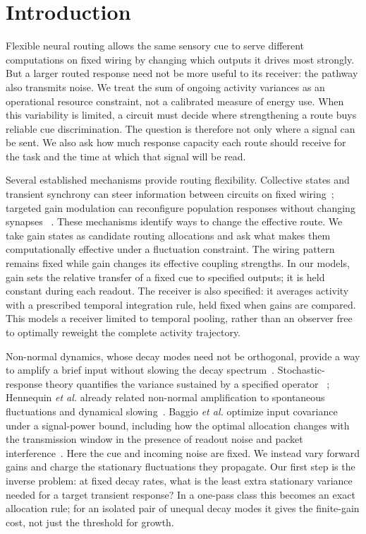 \documentclass[aps,10pt,onecolumn,superscriptaddress,nofootinbib,longbibliography,
  amsmath,amssymb,floatfix]{revtex4-2}
\begin{document}
\section{Introduction}

Flexible neural routing allows the same sensory cue to serve
different computations on fixed wiring by changing which outputs
it drives most strongly. But a larger routed response need not be
more useful to its receiver: the pathway also transmits noise.
We treat the sum of ongoing activity variances as an operational
resource constraint, not a calibrated measure of energy use.
When this variability is limited, a circuit must decide where
strengthening a route buys reliable cue discrimination. The question
is therefore not only where a signal can be sent. We also ask how
much response capacity each route should receive for the task and
the time at which that signal will be read.

Several established mechanisms provide routing flexibility.
Collective states and transient synchrony can steer information
between circuits on fixed wiring~\cite{battaglia2012routing,
palmigiano2017routing,kirst2016routing}; targeted gain modulation
can reconfigure population responses without changing synapses
~\cite{stroud2018,barbosa2023}. These mechanisms identify ways to
change the effective route. We take gain states as candidate routing
allocations and ask what makes them computationally effective under
a fluctuation constraint. The wiring pattern remains fixed while
gain changes its effective coupling strengths. In our models, gain sets the relative
transfer of a fixed cue to specified outputs; it is held constant
during each readout. The receiver is also specified: it averages activity with a
prescribed temporal integration rule, held fixed when gains are
compared. This models a receiver limited to temporal pooling,
rather than an observer free to optimally reweight the complete
activity trajectory.

Non-normal dynamics, whose decay modes need not be orthogonal,
provide a way to amplify a brief input without slowing the decay
spectrum~\cite{trefethen2005,murphy2009,hennequin2012,hennequin2014,
bondanelli2020,christodoulou2022transient}. Stochastic-response
theory quantifies the variance sustained by a specified operator
~\cite{farrellioannou1993stochastic,jovanovic2005}; Hennequin
\emph{et al.} already related non-normal amplification to spontaneous
fluctuations and dynamical slowing~\cite{hennequin2012}.
Baggio \emph{et al.} optimize input covariance under a signal-power
bound, including how the optimal allocation changes with the
transmission window in the presence of readout noise and packet
interference~\cite{baggio2020communication}. Here the cue and incoming
noise are fixed. We instead vary forward gains and charge the
stationary fluctuations they propagate. Our first step is the
inverse problem: at fixed decay rates,
what is the least extra stationary variance needed for a target
transient response? In a one-pass class this becomes an exact
allocation rule; for an isolated pair of unequal decay modes it
gives the finite-gain cost, not just the threshold for growth.
\end{document}
